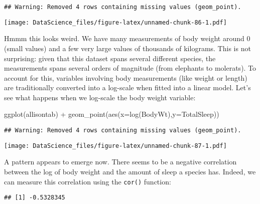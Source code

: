 \documentclass[
]{book}
\newenvironment{Shaded}{\begin{snugshade}}{\end{snugshade}}
\newcommand{\AttributeTok}[1]{\textcolor[rgb]{0.77,0.63,0.00}{#1}}
\newcommand{\FunctionTok}[1]{\textcolor[rgb]{0.00,0.00,0.00}{#1}}
\newcommand{\NormalTok}[1]{#1}
\newcommand{\SpecialCharTok}[1]{\textcolor[rgb]{0.00,0.00,0.00}{#1}}
\newcommand{\StringTok}[1]{\textcolor[rgb]{0.31,0.60,0.02}{#1}}
\begin{document}
\begin{verbatim}
## Warning: Removed 4 rows containing missing values (geom_point).
\end{verbatim}

\texttt{[image: DataScience\_files/figure-latex/unnamed-chunk-86-1.pdf]}

Hmmm this looks weird. We have many measurements of body weight around 0 (small values) and a few very large values of thousands of kilograms. This is not surprising: given that this dataset spans several different species, the measurements spans several orders of magnitude (from elephants to molerats). To account for this, variables involving body measurements (like weight or length) are traditionally converted into a log-scale when fitted into a linear model. Let's see what happens when we log-scale the body weight variable:

\begin{Shaded}
\begin{Highlighting}[]
\FunctionTok{ggplot}\NormalTok{(allisontab) }\SpecialCharTok{+} \FunctionTok{geom\_point}\NormalTok{(}\FunctionTok{aes}\NormalTok{(}\AttributeTok{x=}\FunctionTok{log}\NormalTok{(BodyWt),}\AttributeTok{y=}\NormalTok{TotalSleep))}
\end{Highlighting}
\end{Shaded}

\begin{verbatim}
## Warning: Removed 4 rows containing missing values (geom_point).
\end{verbatim}

\texttt{[image: DataScience\_files/figure-latex/unnamed-chunk-87-1.pdf]}

A pattern appears to emerge now. There seems to be a negative correlation between the log of body weight and the amount of sleep a species has. Indeed, we can measure this correlation using the \texttt{cor()} function:

\begin{Shaded}
\end{Shaded}

\begin{verbatim}
## [1] -0.5328345
\end{verbatim}
\end{document}
